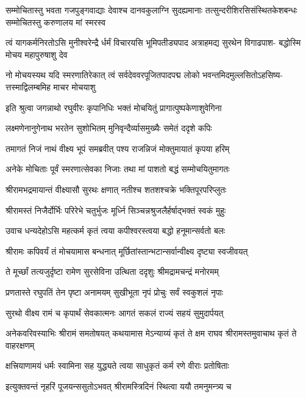 \fourlineindentedshloka
{सम्मोचितास्तु भवता गजपुङ्गवाद्याः}
{देवाश्च दानवकुलाग्नि सुदह्यमानाः}
{तत्सुन्दरीशिरसिसंस्थितकेशबन्धः}
{सम्मोचितस्तु करुणालय मां स्मरस्व}%

\fourlineindentedshloka
{त्वं यागकर्मनिरतोऽसि मुनीश्वरेन्द्रै}
{र्धर्मं विचारयसि भूमिपतीड्यपाद}
{अत्राहमद्य सुरथेन विगाढपाश-}
{बद्धोस्मि मोचय महापुरुषाशु देव}%

\fourlineindentedshloka
{नो मोचयस्यथ यदि स्मरणातिरेकात्}
{त्वं सर्वदेववरपूजितपादपद्म}
{लोको भवन्तमिदमुल्लसितोऽहसिष्य-}
{त्तस्माद्विलम्बमिह माचर मोचयाशु}%

\twolineshloka
{इति श्रुत्वा जगन्नाथो रघुवीरः कृपानिधिः}
{भक्तं मोचयितुं प्रागात्पुष्पकेणाशुवेगिना}%

\twolineshloka
{लक्ष्मणेनानुगेनाथ भरतेन सुशोभितम्}
{मुनिवृन्दैर्व्यासमुख्यैः समेतं ददृशे कपिः}%

\twolineshloka
{तमागतं निजं नाथं वीक्ष्य भूपं समब्रवीत्}
{पश्य राजन्निजं मोक्तुमायातं कृपया हरिम्}%

\twolineshloka
{अनेके मोचिताः पूर्वं स्मरणात्सेवका निजाः}
{तथा मां पाशतो बद्धं सम्मोचयितुमागतः}%

\twolineshloka
{श्रीरामभद्रमायान्तं वीक्ष्यासौ सुरथः क्षणात्}
{नतीश्च शतशश्चक्रे भक्तिपूरपरिप्लुतः}%

\twolineshloka
{श्रीरामस्तं निजैर्दोर्भिः परिरेभे चतुर्भुजः}
{मूर्ध्नि सिञ्चन्नश्रुजलैर्हर्षाद्भक्तं स्वकं मुहुः}%

\twolineshloka
{उवाच धन्यदेहोऽसि महत्कर्म कृतं त्वया}
{कपीश्वरस्त्वया बद्धो हनूमान्सर्वतो बलः}%

\twolineshloka
{श्रीरामः कपिवर्यं तं मोचयामास बन्धनात्}
{मूर्छितांस्तान्भटान्सर्वान्वीक्ष्य दृष्ट्या स्वजीवयत्}%

\twolineshloka
{ते मूर्च्छां तत्यजुर्दृष्टा रामेण सुरसेविना}
{उत्थिता ददृशुः श्रीमद्रामचन्द्रं मनोरमम्}%

\twolineshloka
{प्रणतास्ते रघुपतिं तेन पृष्टा अनामयम्}
{सुखीभूता नृपं प्रोचुः सर्वं स्वकुशलं नृपाः}%

\twolineshloka
{सुरथो वीक्ष्य रामं च कृपार्थं सेवकात्मनः}
{आगतं सकलं राज्यं सहयं सुमुदार्पयत्}%

\threelineshloka
{अनेकवरिवस्याभिः श्रीरामं समतोषयत्}
{कथयामास मेऽन्याय्यं कृतं ते क्षम राघव}
{श्रीरामस्तमुवाचाथ कृतं ते वाहरक्षणम्}%

\twolineshloka
{क्षत्त्रियाणामयं धर्मः स्वामिना सह युद्ध्यते}
{त्वया साधुकृतं कर्म रणे वीराः प्रतोषिताः}%

\twolineshloka
{इत्युक्तवन्तं नृहरिं पूजयन्ससुतोऽभवत्}
{श्रीरामस्त्रिदिनं स्थित्वा ययौ तमनुमन्त्र्य च}%

